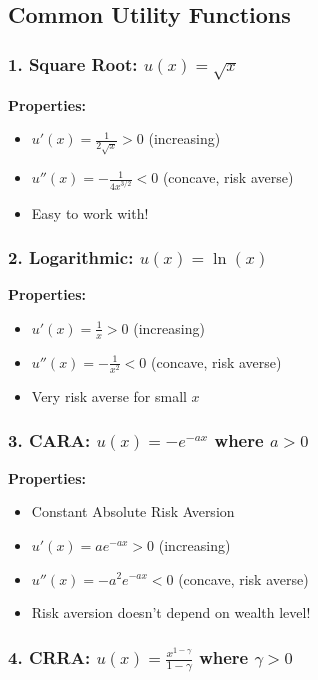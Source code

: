 \documentclass[10pt,letterpaper]{article}
\begin{document}
\subsection{Common Utility Functions}

\subsubsection{1. Square Root: $u(x) = \sqrt{x}$}

\textbf{Properties:}
\begin{itemize}
  \item $u'(x) = \frac{1}{2\sqrt{x}} > 0$ (increasing)
  \item $u''(x) = -\frac{1}{4x^{3/2}} < 0$ (concave, risk averse)
  \item Easy to work with!
\end{itemize}

\subsubsection{2. Logarithmic: $u(x) = \ln(x)$}

\textbf{Properties:}
\begin{itemize}
  \item $u'(x) = \frac{1}{x} > 0$ (increasing)
  \item $u''(x) = -\frac{1}{x^2} < 0$ (concave, risk averse)
  \item Very risk averse for small $x$
\end{itemize}

\subsubsection{3. CARA: $u(x) = -e^{-ax}$ where $a > 0$}

\textbf{Properties:}
\begin{itemize}
  \item Constant Absolute Risk Aversion
  \item $u'(x) = ae^{-ax} > 0$ (increasing)
  \item $u''(x) = -a^2e^{-ax} < 0$ (concave, risk averse)
  \item Risk aversion doesn't depend on wealth level!
\end{itemize}

\subsubsection{4. CRRA: $u(x) = \frac{x^{1-\gamma}}{1-\gamma}$ where $\gamma > 0$}
\end{document}
